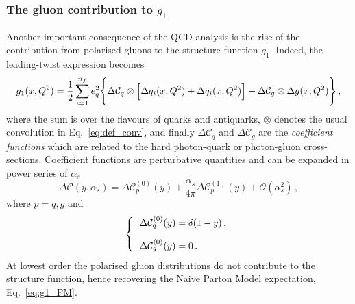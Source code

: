 \subsubsection*{The gluon contribution to $g_1$}
Another important consequence of the QCD analysis is the rise of the contribution from polarised gluons to the structure function $g_1$. Indeed, the leading-twist expression becomes 
\begin{equation}
  g_1(x,Q^2) = \frac{1}{2} \sum_{i=1}^{n_f} e_{q}^2 \Biggl\{ \Delta \mathcal{C}_{q} \otimes \Bigl[ \Delta q_i (x,Q^2) + \Delta \bar{q}_i (x,Q^2) \Bigr] + \Delta \mathcal{C}_{g} \otimes \Delta g (x,Q^2)\Biggr\} \,,
  \label{eq:g1_QFT}
\end{equation}
where the sum is over the flavours of quarks and antiquarks, $\otimes$ denotes the usual convolution in Eq.~\eqref{eq:def_conv}, and finally $\Delta \mathcal{C}_{q}$ and $\Delta \mathcal{C}_{g}$ are the \textit{coefficient functions} which are related to the hard photon-quark or photon-gluon cross-sections. Coefficient functions are perturbative quantities and can be expanded in power series of $\alpha_s$
\begin{equation}
  \Delta \mathcal{C} \left( y, \alpha_s \right) = \Delta \mathcal{C}^{(0)}_{p} (y) + \frac{\alpha_s}{4\pi} \Delta \mathcal{C}^{(1)}_{p} (y) + \mathcal{O}(\alpha_s^2)\,,
\end{equation}
where $p=q,g$ and
\begin{equation}
  \left\{ \hspace{-3mm}
  \begin{array}{cl}
    &\Delta \mathcal{C}_{q}^{(0)} (y) = \delta(1-y)\,,\\[10pt]
    &\Delta \mathcal{C}_{g}^{(0)} (y) = 0 \,. \\
  \end{array}
  \right.
\end{equation}
At lowest order the polarised gluon distributions do not contribute to the structure function, hence recovering the Naive Parton Model expectation, Eq.~\eqref{eq:g1_PM}.\par
